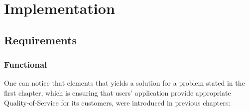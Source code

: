 \chapter{Implementation}


\section{Requirements}
\subsection{Functional}
One can notice that elements that yields a solution for
a problem stated in the first chapter, which is ensuring that users'
application provide appropriate Quality-of-Service for its customers, were
introduced in previous chapters:

